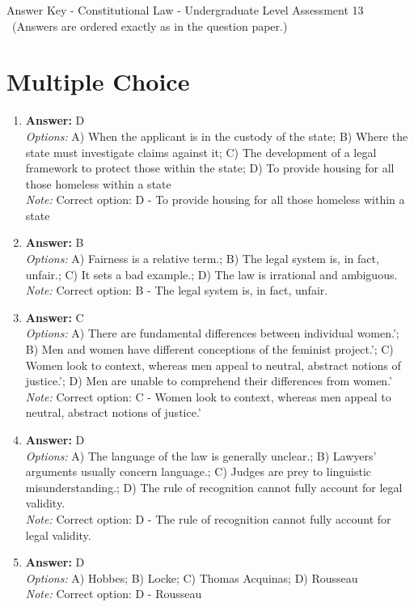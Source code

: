 \documentclass[12pt]{article}
\begin{document}
\begin{center}
Answer Key - Constitutional Law - Undergraduate Level Assessment 13 \
\small (Answers are ordered exactly as in the question paper.)
\end{center}

\section*{Multiple Choice}
\begin{enumerate}[label=\arabic*.]
\item \textbf{Answer:} D
\\ \textit{Options:} A) When the applicant is in the custody of the state; B) Where the state must investigate claims against it; C) The development of a legal framework to protect those within the state; D) To provide housing for all those homeless within a state
\\ \textit{Note:} Correct option: D - To provide housing for all those homeless within a state
\item \textbf{Answer:} B
\\ \textit{Options:} A) Fairness is a relative term.; B) The legal system is, in fact, unfair.; C) It sets a bad example.; D) The law is irrational and ambiguous.
\\ \textit{Note:} Correct option: B - The legal system is, in fact, unfair.
\item \textbf{Answer:} C
\\ \textit{Options:} A) There are fundamental differences between individual women.'; B) Men and women have different conceptions of the feminist project.'; C) Women look to context, whereas men appeal to neutral, abstract notions of justice.'; D) Men are unable to comprehend their differences from women.'
\\ \textit{Note:} Correct option: C - Women look to context, whereas men appeal to neutral, abstract notions of justice.'
\item \textbf{Answer:} D
\\ \textit{Options:} A) The language of the law is generally unclear.; B) Lawyers' arguments usually concern language.; C) Judges are prey to linguistic misunderstanding.; D) The rule of recognition cannot fully account for legal validity.
\\ \textit{Note:} Correct option: D - The rule of recognition cannot fully account for legal validity.
\item \textbf{Answer:} D
\\ \textit{Options:} A) Hobbes; B) Locke; C) Thomas Acquinas; D) Rousseau
\\ \textit{Note:} Correct option: D - Rousseau
\end{enumerate}
\end{document}
